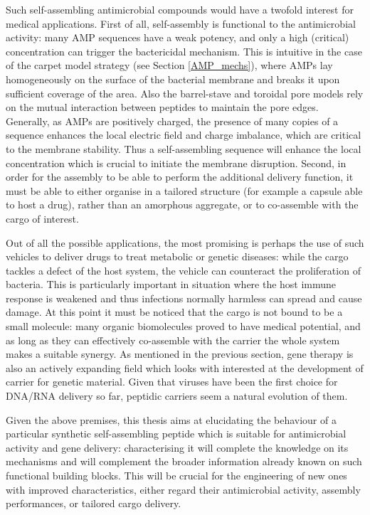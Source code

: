 Such self-assembling antimicrobial compounds would have a twofold interest for medical applications.
%
First of all, self-assembly is functional to the antimicrobial activity: many AMP sequences have a weak potency, and only a high (critical) concentration can trigger the bactericidal mechanism. This is intuitive in the case of the carpet model strategy (see Section \ref{AMP_mechs}), where AMPs lay homogeneously on the surface of the bacterial membrane and breaks it upon sufficient coverage of the area. Also the barrel-stave and toroidal pore models rely on the mutual interaction between peptides to maintain the pore edges.
%
Generally, as AMPs are positively charged, the presence of many copies of a sequence enhances the local electric field and charge imbalance, which are critical to the membrane stability. Thus a self-assembling sequence will enhance the local concentration which is crucial to initiate the membrane disruption.
%
Second, in order for the assembly to be able to perform the additional delivery function, it must be able to either organise in a tailored structure (for example a capsule able to host a drug), rather than an amorphous aggregate, or to co-assemble with the cargo of interest.

Out of all the possible applications, the most promising is perhaps the use of such vehicles to deliver drugs to treat metabolic or genetic diseases: while the cargo tackles a defect of the host system, the vehicle can counteract the proliferation of bacteria. This is particularly important in situation where the host immune response is weakened and thus infections normally harmless can spread and cause damage.
%
At this point it must be noticed that the cargo is not bound to be a small molecule: many organic biomolecules proved to have medical potential, and as long as they can effectively co-assemble with the carrier the whole system makes a suitable synergy. As mentioned in the previous section, gene therapy is also an actively expanding field which looks with interested at the development of carrier for genetic material. Given that viruses have been the first choice for DNA/RNA delivery so far, peptidic carriers seem a natural evolution of them.

\bigskip
Given the above premises, this thesis aims at elucidating the behaviour of a particular synthetic self-assembling peptide which is suitable for antimicrobial activity and gene delivery: characterising it will complete the knowledge on its mechanisms and will complement the broader information already known on such functional building blocks. This will be crucial for the engineering of new ones with improved characteristics, either regard their antimicrobial activity, assembly performances, or tailored cargo delivery.


